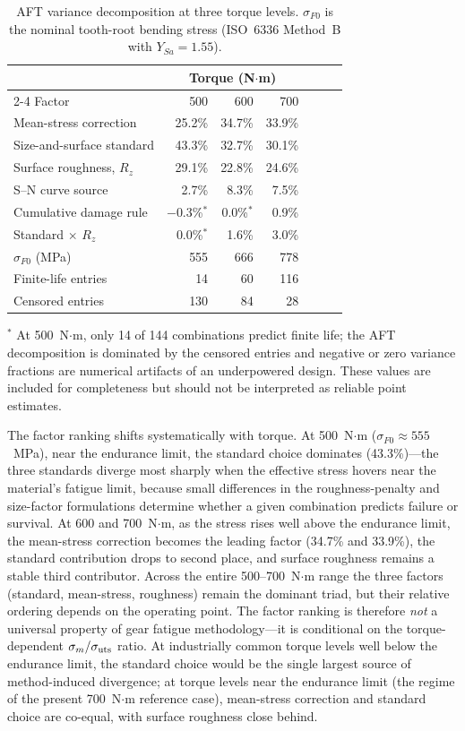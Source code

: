\documentclass[12pt,a4paper]{article}
\begin{document}
\begin{table}[h]
\centering
\caption{AFT variance decomposition at three torque levels.
$\sigma_{F0}$ is the nominal tooth-root bending stress (ISO~6336
Method~B with $Y_{Sa}=1.55$).%
}
\label{tab:torque}
\begin{tabular}{lrrrrrr}
\toprule
& \multicolumn{3}{c}{Torque (N$\cdot$m)} \\
\cmidrule(lr){2-4}
Factor & 500 & 600 & 700 \\
\midrule
Mean-stress correction & 25.2\% & 34.7\% & 33.9\% \\
Size-and-surface standard & 43.3\% & 32.7\% & 30.1\% \\
Surface roughness, $R_z$ & 29.1\% & 22.8\% & 24.6\% \\
S--N curve source & 2.7\% & 8.3\% & 7.5\% \\
Cumulative damage rule & $-$0.3\%$^*$ & 0.0\%$^*$ & 0.9\% \\
Standard $\times$ $R_z$ & 0.0\%$^*$ & 1.6\% & 3.0\% \\
\midrule
$\sigma_{F0}$ (MPa) & 555 & 666 & 778 \\
Finite-life entries & 14 & 60 & 116 \\
Censored entries & 130 & 84 & 28 \\
\bottomrule
\end{tabular}
\medskip\par
\small $^*$ At 500~N$\cdot$m, only 14 of 144 combinations predict
finite life; the AFT decomposition is dominated by the censored entries
and negative or zero variance fractions are numerical artifacts of an
underpowered design. These values are included for completeness but
should not be interpreted as reliable point estimates.
\end{table}

The factor ranking shifts systematically with torque. At
500~N$\cdot$m ($\sigma_{F0} \approx 555$~MPa), near the endurance
limit, the standard choice dominates (43.3\%)---the three standards
diverge most sharply when the effective stress hovers near the
material's fatigue limit, because small differences in the
roughness-penalty and size-factor formulations determine whether a
given combination predicts failure or survival. At 600 and
700~N$\cdot$m, as the stress rises well above the endurance limit, the
mean-stress correction becomes the leading factor (34.7\% and 33.9\%),
the standard contribution drops to second place, and surface roughness
remains a stable third contributor. Across the entire 500--700~N$\cdot$m
range the three factors (standard, mean-stress, roughness) remain the
dominant triad, but their relative ordering depends on the operating
point. The factor ranking is therefore \emph{not} a universal property
of gear fatigue methodology---it is conditional on the torque-dependent
$\sigma_m/\sigma_{\rm uts}$ ratio. At industrially common torque levels
well below the endurance limit, the standard choice would be the
single largest source of method-induced divergence; at torque levels
near the endurance limit (the regime of the present 700~N$\cdot$m
reference case), mean-stress correction and standard choice are
co-equal, with surface roughness close behind.
\end{document}
